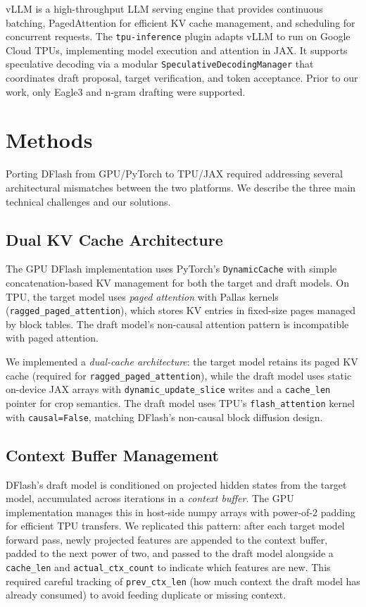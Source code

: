 \documentclass[12pt,letterpaper]{article}
\begin{document}
vLLM \citep{kwon2023efficientmemorymanagementlarge} is a high-throughput LLM serving engine that provides continuous batching, PagedAttention for efficient KV cache management, and scheduling for concurrent requests. The \texttt{tpu-inference} plugin \citep{tpuinference} adapts vLLM to run on Google Cloud TPUs, implementing model execution and attention in JAX. It supports speculative decoding via a modular \texttt{SpeculativeDecodingManager} that coordinates draft proposal, target verification, and token acceptance. Prior to our work, only Eagle3 and n-gram drafting were supported.


\section{Methods}

Porting DFlash from GPU/PyTorch to TPU/JAX required addressing several architectural mismatches between the two platforms. We describe the three main technical challenges and our solutions.

\subsection{Dual KV Cache Architecture}

The GPU DFlash implementation uses PyTorch's \texttt{DynamicCache} with simple concatenation-based KV management for both the target and draft models. On TPU, the target model uses \emph{paged attention} with Pallas kernels (\texttt{ragged\_paged\_attention}), which stores KV entries in fixed-size pages managed by block tables. The draft model's non-causal attention pattern is incompatible with paged attention.

We implemented a \textit{dual-cache architecture}: the target model retains its paged KV cache (required for \texttt{ragged\_paged\_attention}), while the draft model uses static on-device JAX arrays with \texttt{dynamic\_update\_slice} writes and a \texttt{cache\_len} pointer for crop semantics. The draft model uses TPU's \texttt{flash\_attention} kernel with \texttt{causal=False}, matching DFlash's non-causal block diffusion design.

\subsection{Context Buffer Management}

DFlash's draft model is conditioned on projected hidden states from the target model, accumulated across iterations in a \emph{context buffer}. The GPU implementation manages this in host-side numpy arrays with power-of-2 padding for efficient TPU transfers. We replicated this pattern: after each target model forward pass, newly projected features are appended to the context buffer, padded to the next power of two, and passed to the draft model alongside a \texttt{cache\_len} and \texttt{actual\_ctx\_count} to indicate which features are new. This required careful tracking of \texttt{prev\_ctx\_len} (how much context the draft model has already consumed) to avoid feeding duplicate or missing context.
\end{document}

